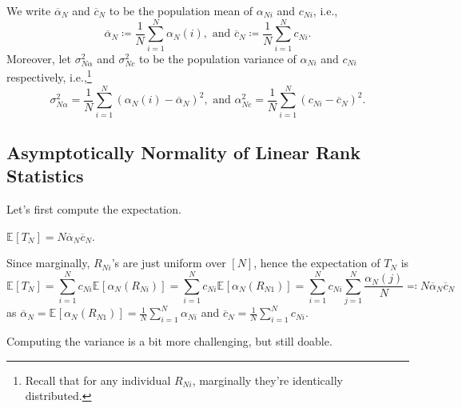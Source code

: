 \begin{notation}
	We write \(\overline{\alpha} _N\) and \(\overline{c} _N\) to be the population mean of \(\alpha _{Ni}\) and \(c_{Ni}\), i.e.,
	\[
		\overline{\alpha} _N \coloneqq \frac{1}{N} \sum_{i=1}^{N} \alpha _N(i), \text{ and }
		\overline{c} _N \coloneqq \frac{1}{N} \sum_{i=1}^{N} c_{Ni}.
	\]
	Moreover, let \(\sigma _{N \alpha }^2\) and \(\sigma _{Nc}^2\) to be the population variance of \(\alpha _{Ni}\) and \(c_{Ni}\) respectively, i.e.,\footnote{Recall that for any individual \(R_{Ni}\), marginally they're identically distributed.}
	\[
		\sigma _{N \alpha }^2 = \frac{1}{N} \sum_{i=1}^{N} (\alpha _N(i) - \overline{\alpha} _N)^2, \text{ and }
		\alpha _{N c}^2 = \frac{1}{N} \sum_{i=1}^{N} (c_{Ni} - \overline{c} _N)^2.
	\]
\end{notation}

\subsection{Asymptotically Normality of Linear Rank Statistics}
Let's first compute the expectation.

\begin{claim}
	\(\mathbb{E}_{}[T_N] = N \overline{\alpha} _N \overline{c} _N\).
\end{claim}
\begin{explanation}
	Since marginally, \(R_{Ni}\)'s are just uniform over \([N]\), hence the expectation of \(T_N\) is
	\[
		\mathbb{E}_{}[T_N]
		= \sum_{i=1}^{N} c_{Ni} \mathbb{E}_{}[\alpha _N(R_{Ni})]
		= \sum_{i=1}^{N} c_{Ni} \mathbb{E}_{}[\alpha _N(R_{N1})]
		= \sum_{i=1}^{N} c_{Ni} \sum_{j=1}^{N} \frac{\alpha _N(j)}{N}
		\eqqcolon N \overline{\alpha} _N \overline{c} _N
	\]
	as \(\overline{\alpha} _N = \mathbb{E}_{}[\alpha _N(R_{N1})] = \frac{1}{N} \sum_{i=1}^{N} \alpha _{Ni}\) and \(\overline{c} _N = \frac{1}{N} \sum_{i=1}^{N} c_{Ni}\).
\end{explanation}

Computing the variance is a bit more challenging, but still doable.

